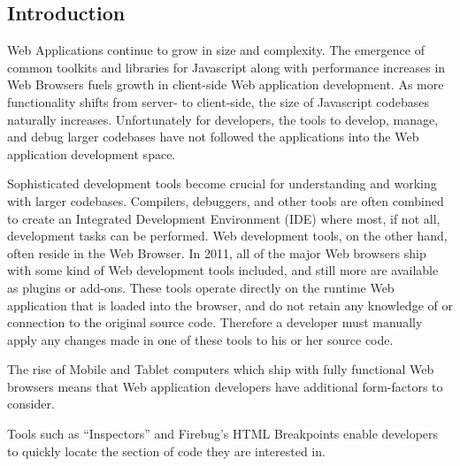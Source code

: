 \begin{introduction}
\section{Introduction}
Web Applications continue to grow in size and complexity. The
emergence of common toolkits and libraries for Javascript along with performance
increases in Web Browsers fuels growth in client-side Web application
development. As more functionality shifts from server- to client-side, the size
of Javascript codebases naturally increases. Unfortunately for developers, the
tools to develop, manage, and debug larger codebases have not followed the
applications into the Web application development space.

Sophisticated development tools become crucial for understanding
and working with larger codebases. Compilers, debuggers, and other tools are
often combined to create an Integrated Development Environment (IDE) where
most, if not all, development tasks can be performed. Web development tools, on
the other hand, often reside in the Web Browser. In 2011, all of the major Web
browsers ship with some kind of Web development tools included\cite{something},
and still more are available as plugins or add-ons. These tools operate
directly on the runtime Web application that is loaded into the browser, and do
not retain any knowledge of or connection to the original source code. Therefore
a developer must manually apply any changes made in one of these tools to his or
her source code.

The rise of Mobile and Tablet computers which ship with fully functional Web
browsers means that Web application developers have additional form-factors to
consider.

Tools such as ``Inspectors'' and Firebug's HTML Breakpoints\cite{jjb-www2010}
enable developers to quickly locate the section of code they are interested in.
\end{introduction}
